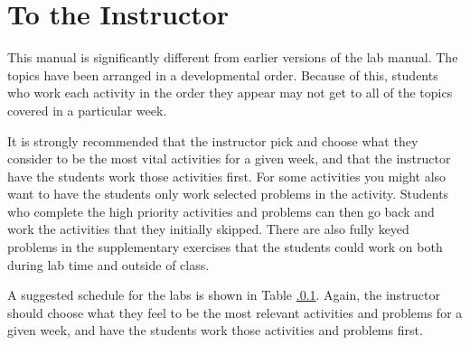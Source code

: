 \documentclass[12pt,]{book}
\theoremstyle{plain}
\theoremstyle{definition}
\numberwithin{equation}{section}
\begin{document}
\chapter*{To the Instructor}\label{to-the-instructor}
This manual is significantly different from earlier versions of the lab manual. The topics have been arranged in a developmental order. Because of this, students who work each activity in the order they appear may not get to all of the topics covered in a particular week.%
\par
It is strongly recommended that the instructor pick and choose what they consider to be the most vital activities for a given week, and that the instructor have the students work those activities first. For some activities you might also want to have the students only work selected problems in the activity. Students who complete the high priority activities and problems can then go back and work the activities that they initially skipped. There are also fully keyed problems in the supplementary exercises that the students could work on both during lab time and outside of class.%
\par
A suggested schedule for the labs is shown in Table \hyperref[table-suggested-schedule]{.0.1}. Again, the instructor should choose what they feel to be the most relevant activities and problems for a given week, and have the students work those activities and problems first.%
\end{document}
